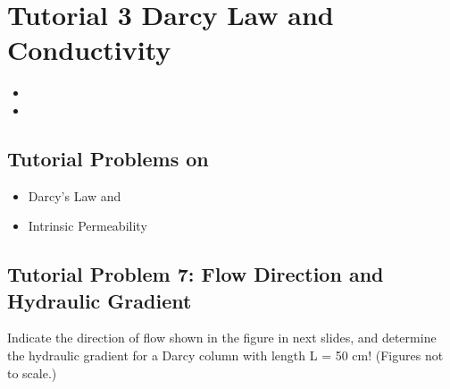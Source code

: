 \documentclass[letterpaper,10pt,english]{sphinxmanual}
\begin{document}
\begin{sphinxVerbatim}[commandchars=\\\{\}]
   
   
    
   
\end{sphinxVerbatim}


\section{Tutorial 3 \sphinxhyphen{} Darcy Law and Conductivity}
\label{\detokenize{contents/tutorials/tutorial_03/tutorial_03:tutorial-3-darcy-law-and-conductivity}}\label{\detokenize{contents/tutorials/tutorial_03/tutorial_03::doc}}
\begin{itemize}
\item {} 

\item {} 

\end{itemize}


\subsection{Tutorial Problems on}
\label{\detokenize{contents/tutorials/tutorial_03/tutorial_03:tutorial-problems-on}}\begin{itemize}
\item {} 
Darcy’s Law and

\item {} 
Intrinsic Permeability

\end{itemize}


\subsection{Tutorial Problem 7: Flow Direction and Hydraulic Gradient}
\label{\detokenize{contents/tutorials/tutorial_03/tutorial_03:tutorial-problem-7-flow-direction-and-hydraulic-gradient}}
Indicate the direction of flow shown in the figure in next slides, and determine the hydraulic gradient for a Darcy column with length L = 50 cm! (Figures not to scale.)
\end{document}
